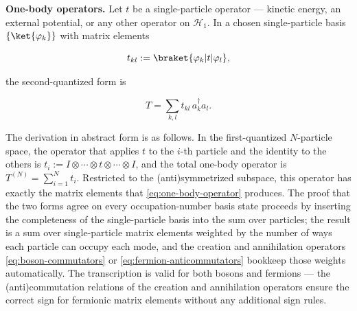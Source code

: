 \medskip\noindent\textbf{One-body operators.}
Let $t$ be a single-particle operator --- kinetic energy, an external potential, or any other operator on $\mathcal{H}_1$. In a chosen single-particle basis $\{\ket{\varphi_k}\}$ with matrix elements
\begin{linenomath}
    \begin{equation*}
        t_{kl} := \braket{\varphi_k|t|\varphi_l},
    \end{equation*}
\end{linenomath}
the second-quantized form is
\begin{linenomath}
    \begin{equation}
        T = \sum_{k,l} t_{kl}\,a_k^\dagger a_l.
        \label{eq:one-body-operator}
    \end{equation}
\end{linenomath}
The derivation in abstract form is as follows. In the first-quantized $N$-particle space, the operator that applies $t$ to the $i$-th particle and the identity to the others is $t_i := I \otimes \cdots \otimes t \otimes \cdots \otimes I$, and the total one-body operator is $T^{(N)} = \sum_{i=1}^N t_i$. Restricted to the (anti)symmetrized subspace, this operator has exactly the matrix elements that \eqref{eq:one-body-operator} produces. The proof that the two forms agree on every occupation-number basis state proceeds by inserting the completeness of the single-particle basis into the sum over particles; the result is a sum over single-particle matrix elements weighted by the number of ways each particle can occupy each mode, and the creation and annihilation operators \eqref{eq:boson-commutators} or \eqref{eq:fermion-anticommutators} bookkeep those weights automatically. The transcription is valid for both bosons and fermions --- the (anti)commutation relations of the creation and annihilation operators ensure the correct sign for fermionic matrix elements without any additional sign rules.

